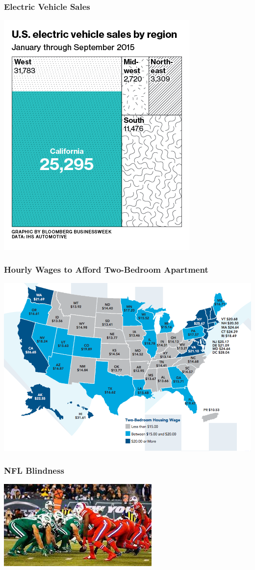 \documentclass{beamer} %
\begin{document}
\begin{frame}\frametitle{Electric Vehicle Sales}
	\centering
	\includegraphics[width=0.66\linewidth]{electric.png}
\end{frame}



\begin{frame}\frametitle{Hourly Wages to Afford Two-Bedroom Apartment}
	\includegraphics[width=\linewidth]{hourly.png}
\end{frame}


\begin{frame}\frametitle{NFL Blindness}
	\centering
	\includegraphics[width=\linewidth]{nfl1.jpg}
\end{frame}
\end{document}
